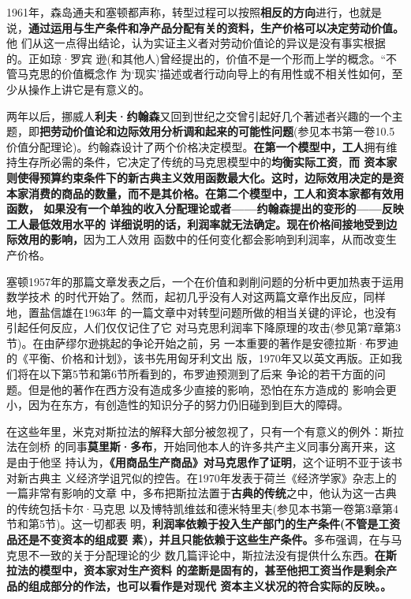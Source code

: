 1961年，森岛通夫和塞顿都声称，转型过程可以按照\textbf{相反的方向}进行，也就是
说，\textbf{通过运用与生产条件和净产品分配有关的资料，生产价格可以决定劳动价值。}他
们从这一点得出结论，认为实证主义者对劳动价值论的异议是没有事实根据的。正如琼·罗宾
逊(和其他人)曾经提出的，价值不是一个形而上学的概念。“不管马克思的价值概念作
为‘现实’描述或者行动向导上的有用性或不相关性如何，至少从操作上讲它是有意义的。

两年以后，挪威人\textbf{利夫·约翰森}又回到世纪之交曾引起好几个著述者兴趣的一个主
题，即\textbf{把劳动价值论和边际效用分析调和起来的可能性问题}(参见本书第一卷10.5
价值分配理论)。约翰森设计了两个价格决定模型。\textbf{在第一个模型中，工人}拥有维
持生存所必需的条件，它决定了传统的马克思模型中的\textbf{均衡实际工资}，\textbf{而
  资本家则使得预算约束条件下的新古典主义效用函数最大化。这时，边际效用决定的是资
  本家消费的商品的数量，而不是其价格。在第二个模型中，工人和资本家都有效用函数，
  如果没有一个单独的收入分配理论或者——约翰森提出的变形的——反映工人最低效用水平的
  详细说明的话，利润率就无法确定。现在价格间接地受到边际效用的影响，}因为工人效用
函数中的任何变化都会影响到利润率，从而改变生产价格。

塞顿1957年的那篇文章发表之后，一个在价值和剥削问题的分析中更加热衷于运用数学技术
的时代开始了。然而，起初几乎没有人对这两篇文章作出反应，同样地，置盐信雄在1963年
的一篇文章中对转型问题所做的相当关键的评论，也没有引起任何反应，人们仅仅记住了它
对马克思利润率下降原理的攻击(参见第7章第3节)。在由萨缪尔逊挑起的争论开始之前，另
一本重要的著作是安德拉斯·布罗迪的《平衡、价格和计划》，该书先用匈牙利文出
版，1970年又以英文再版。正如我们将在以下第5节和第6节所看到的，布罗迪预测到了后来
争论的若干方面的问题。但是他的著作在西方没有造成多少直接的影响，恐怕在东方造成的
影响会更小，因为在东方，有创造性的知识分子的努力仍旧碰到到巨大的障碍。

在这些年里，米克对斯拉法的解释大部分被忽视了，只有一个有意义的例外：斯拉法在剑桥
的同事\textbf{莫里斯·多布}，开始同他本人的许多共产主义同事分离开来，这是由于他坚
持认为，\textbf{《用商品生产商品》对马克思作了证明}，这个证明不亚于该书对新古典主
义经济学诅咒似的控告。在1970年发表于荷兰《经济学家》杂志上的一篇非常有影响的文章
中，多布把斯拉法置于\textbf{古典的传统}之中，他认为这一古典的传统包括卡尔·马克思
以及博特凯维兹和德米特里夫(参见本书第一卷第3章第4节和第5节)。这一切都表
明，\textbf{利润率依赖于投入生产部门的生产条件(不管是工资品还是不变资本的组成要
  素)，并且只能依赖于这些生产条件。}多布强调，在与马克思不一致的关于分配理论的少
数几篇评论中，斯拉法没有提供什么东西。\textbf{在斯拉法的模型中，资本家对生产资料
  的垄断是固有的，甚至他把工资当作是剩余产品的组成部分的作法，也可以看作是对现代
  资本主义状况的符合实际的反映。。}

